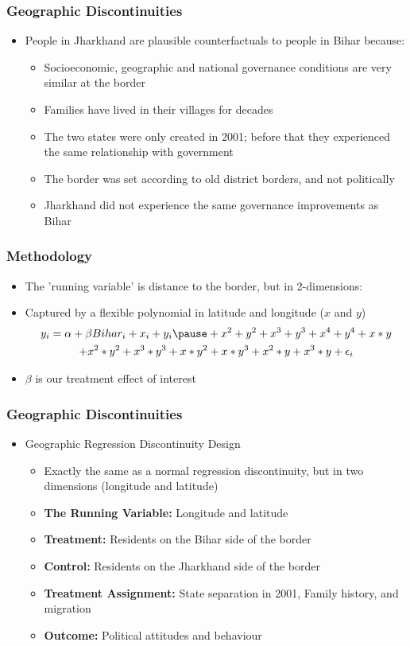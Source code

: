 \documentclass[xcolor=x11names,compress]{beamer}\usepackage[]{graphicx}\usepackage[]{color}
\renewcommand{\(}{\begin{columns}}
\renewcommand{\)}{\end{columns}}
\newcommand{\<}[1]{\begin{column}{#1}}
\renewcommand{\>}{\end{column}}
\begin{document}
\begin{frame}
\frametitle{Geographic Discontinuities}
\begin{itemize}
\item People in Jharkhand are plausible counterfactuals to people in Bihar because:
\pause
\begin{itemize}
\item Socioeconomic, geographic and national governance conditions are very similar at the border
\pause
\item Families have lived in their villages for decades
\pause
\item The two states were only created in 2001; before that they experienced the same relationship with government
\pause
\item The border was set according to old district borders, and not politically
\pause
\item Jharkhand did not experience the same governance improvements as Bihar
\end{itemize}
\end{itemize}
\end{frame}

\begin{frame}
\frametitle{Methodology}
\begin{itemize}
\item The 'running variable' is distance to the border, but in 2-dimensions:
\item Captured by a flexible polynomial in latitude and longitude ($x$ and $y$)
\begin{multline}
y_i = \alpha + \beta Bihar_i + x_i + y_i \pause + x^2 + y^2 + x^3 + y^3 + x^4 + y^4 + x*y  \\+ x^2*y^2 + x^3*y^3 + x*y^2 + x*y^3 + x^2*y + x^3*y + \epsilon_i
\end{multline}
\item $\beta$ is our treatment effect of interest
\end{itemize}
\end{frame}

\begin{frame}
\frametitle{Geographic Discontinuities}
\begin{itemize}
\item Geographic Regression Discontinuity Design
\begin{itemize}
\item Exactly the same as a normal regression discontinuity, but in two dimensions (longitude and latitude)
\pause
\item \textbf{The Running Variable:} \pause Longitude and latitude
\pause 
\item \textbf{Treatment:} \pause Residents on the Bihar side of the border
\pause 
\item \textbf{Control:} \pause Residents on the Jharkhand side of the border
\pause 
\item \textbf{Treatment Assignment:} \pause State separation in 2001, Family history, and migration
\pause 
\item \textbf{Outcome:} \pause Political attitudes and behaviour
\end{itemize}
\end{itemize}
\end{frame}
\end{document}
